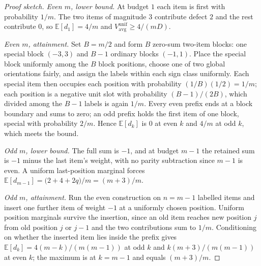 \begin{proof}[Proof sketch]
\emph{Even $m$, lower bound.} At budget $1$ each item is first with probability $1/m$. The two
items of magnitude $3$ contribute defect $2$ and the rest contribute $0$, so
$\mathbb{E}[d_{1}]=4/m$ and $V^{\mathrm{unif}}_{\mathrm{avg}}\ge4/(mD)$.

\emph{Even $m$, attainment.} Set $B=m/2$ and form $B$ zero-sum two-item blocks: one special
block $(-3,3)$ and $B-1$ ordinary blocks $(-1,1)$. Place the special block uniformly among the
$B$ block positions, choose one of two global orientations fairly, and assign the labels
within each sign class uniformly. Each special item then occupies each position with
probability $(1/B)(1/2)=1/m$; each position is a negative unit slot with probability
$(B-1)/(2B)$, which divided among the $B-1$ labels is again $1/m$. Every even prefix ends at a
block boundary and sums to zero; an odd prefix holds the first item of one block, special with
probability $2/m$. Hence $\mathbb{E}[d_{k}]$ is $0$ at even $k$ and $4/m$ at odd $k$, which
meets the bound.

\emph{Odd $m$, lower bound.} The full sum is $-1$, and at budget $m-1$ the retained sum is
$-1$ minus the last item's weight, with no parity subtraction since $m-1$ is even. A uniform
last-position marginal forces
$\mathbb{E}[d_{m-1}]=\bigl(2+4+2q\bigr)/m=(m+3)/m$.

\emph{Odd $m$, attainment.} Run the even construction on $n=m-1$ labelled items and insert one
further item of weight $-1$ at a uniformly chosen position. Uniform position marginals survive
the insertion, since an old item reaches new position $j$ from old position $j$ or $j-1$ and
the two contributions sum to $1/m$. Conditioning on whether the inserted item lies inside the
prefix gives $\mathbb{E}[d_{k}]=4(m-k)/(m(m-1))$ at odd $k$ and $k(m+3)/(m(m-1))$ at even $k$;
the maximum is at $k=m-1$ and equals $(m+3)/m$.
\end{proof}


